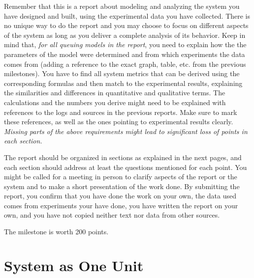 \documentclass[11pt]{article}
\begin{document}
Remember  that  this is  a  report  about modeling  and  analyzing the  system you  have  designed  and  built, using  the experimental data you have collected. There is no unique way to do the report and you may choose  to  focus  on  different  aspects  of  the  system  as  long  as  you deliver a  complete analysis of  its behavior. Keep in mind that, \emph{for all queuing models in the report}, you need to explain how the the parameters of the model were determined and from which experiments the data comes from (adding a reference to the exact graph, table, etc. from the previous milestones). You have to find all system metrics that can be derived using the corresponding formulas and then match to the experimental results, explaining the similarities and differences in quantitative and qualitative terms. The calculations and the numbers you derive might need to be explained with references to the logs and sources in the previous reports. Make sure to mark these references, as well as the ones pointing to experimental results clearly. \textit{Missing parts of the above requirements might lead to significant loss of points in each section.}

The report should be organized in sections as explained in the next pages, and each section should address at least the questions mentioned for each point. You might be called for a meeting in person to clarify aspects of the report or the system and to make a short presentation of the work done. By submitting the report, you  confirm  that  you  have  done  the  work  on  your  own,  the  data used comes  from  experiments  your have  done,  you  have  written  the  report  on  your  own,  and  you have  not  copied  neither text nor data from other sources.

\medskip
The milestone is worth 200 points. 


\pagebreak
\fi

\section{System as One Unit}\label{sec:system-one-unit}

\end{document}
